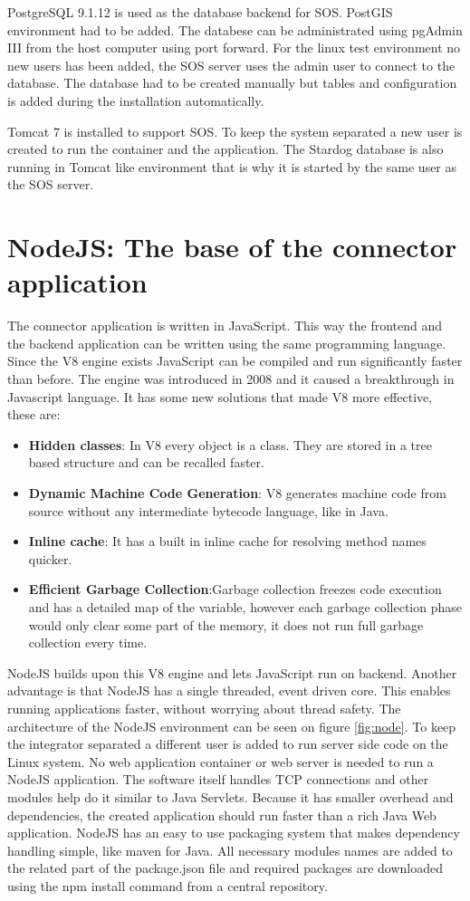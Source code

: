 PostgreSQL 9.1.12 is used as the database backend for SOS. PostGIS environment had to be added. The databese can be administrated using pgAdmin III from the host computer using port forward. For the linux test environment no new users has been added, the SOS server uses the admin user to connect to the database. The database had to be created manually but tables and configuration is added during the installation automatically.

Tomcat 7 is installed to support SOS. To keep the system separated a new user is created to run the container and the application. The Stardog database is also running in Tomcat like environment that is why it is started by the same user as the SOS server. 

\section{NodeJS: The base of the connector application}

The connector application is written in JavaScript. This way the frontend and the backend application can be written using the same programming language. 
Since the V8 engine exists JavaScript can be compiled and run significantly faster\cite{v8} than before. 
The engine was introduced in 2008 and it caused a breakthrough in Javascript language. It has some new solutions that made V8 more effective, these are:
\begin{itemize}
\item \textbf{Hidden classes}: In V8 every object is a class. They are stored in a tree based structure and can be recalled faster.
\item \textbf{Dynamic Machine Code Generation}: V8 generates machine code from source without any intermediate bytecode language, like in Java.
\item \textbf{Inline cache}: It has a built in inline cache for resolving method names quicker.
\item \textbf{Efficient Garbage Collection}:Garbage collection freezes code execution and has a detailed map of the variable, however each garbage collection phase would only clear some part of the memory, it does not run full garbage collection every time.
\end{itemize}
NodeJS builds upon this V8 engine and lets JavaScript run on backend. Another advantage is that NodeJS has a single threaded, event driven core. This enables running applications faster, without worrying about thread safety. The architecture of the NodeJS environment can be seen on figure \ref{fig:node}. To keep the integrator separated a different user is added to run server side code on the Linux system. No web application container or web server is needed to run a NodeJS application. The software itself handles TCP connections and other modules help do it similar to Java Servlets. Because it has smaller overhead and dependencies, the created application should run faster than a rich Java Web application. NodeJS has an easy to use packaging system that makes dependency handling simple, like maven for Java. All necessary modules names are added to the related part of the package.json file and required packages are downloaded using the npm install command from a central repository. 

